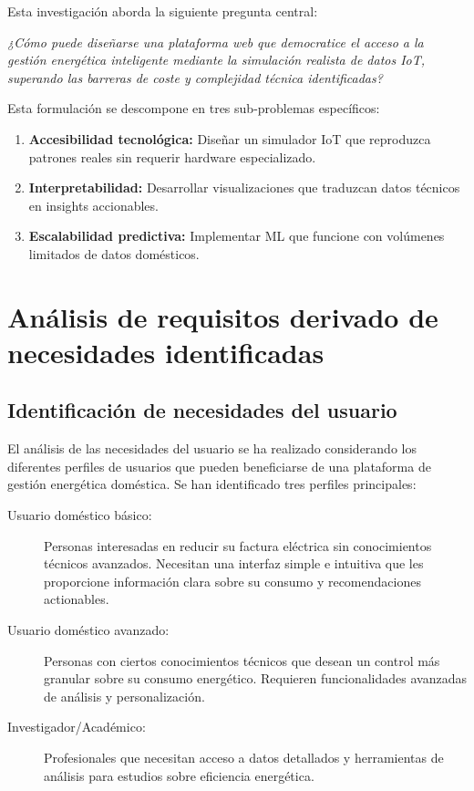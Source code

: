 Esta investigación aborda la siguiente pregunta central:

\textit{¿Cómo puede diseñarse una plataforma web que democratice el acceso a la gestión energética inteligente mediante la simulación realista de datos IoT, superando las barreras de coste y complejidad técnica identificadas?}

Esta formulación se descompone en tres sub-problemas específicos:

\begin{enumerate}
    \item \textbf{Accesibilidad tecnológica:} Diseñar un simulador IoT que reproduzca patrones reales sin requerir hardware especializado.
    \item \textbf{Interpretabilidad:} Desarrollar visualizaciones que traduzcan datos técnicos en insights accionables.
    \item \textbf{Escalabilidad predictiva:} Implementar ML que funcione con volúmenes limitados de datos domésticos.
\end{enumerate}

\section{Análisis de requisitos derivado de necesidades identificadas}

\subsection{Identificación de necesidades del usuario}

El análisis de las necesidades del usuario se ha realizado considerando los diferentes perfiles de usuarios que pueden beneficiarse de una plataforma de gestión energética doméstica. Se han identificado tres perfiles principales:

\begin{description}
    \item[Usuario doméstico básico:] Personas interesadas en reducir su factura eléctrica sin conocimientos técnicos avanzados. Necesitan una interfaz simple e intuitiva que les proporcione información clara sobre su consumo y recomendaciones actionables.
    
    \item[Usuario doméstico avanzado:] Personas con ciertos conocimientos técnicos que desean un control más granular sobre su consumo energético. Requieren funcionalidades avanzadas de análisis y personalización.
    
    \item[Investigador/Académico:] Profesionales que necesitan acceso a datos detallados y herramientas de análisis para estudios sobre eficiencia energética.
\end{description}

